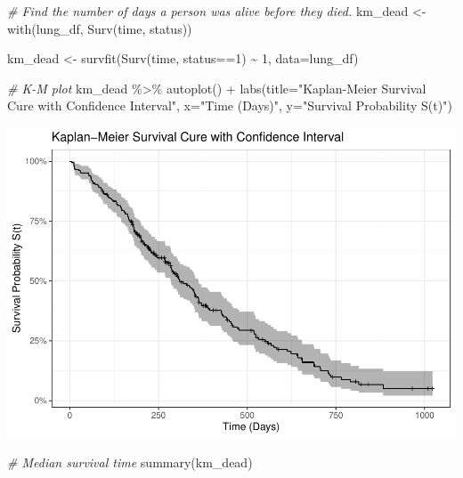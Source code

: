 \documentclass[
]{article}
\newenvironment{Shaded}{\begin{snugshade}}{\end{snugshade}}
\newcommand{\AttributeTok}[1]{\textcolor[rgb]{0.77,0.63,0.00}{#1}}
\newcommand{\CommentTok}[1]{\textcolor[rgb]{0.56,0.35,0.01}{\textit{#1}}}
\newcommand{\DecValTok}[1]{\textcolor[rgb]{0.00,0.00,0.81}{#1}}
\newcommand{\FunctionTok}[1]{\textcolor[rgb]{0.00,0.00,0.00}{#1}}
\newcommand{\NormalTok}[1]{#1}
\newcommand{\OtherTok}[1]{\textcolor[rgb]{0.56,0.35,0.01}{#1}}
\newcommand{\SpecialCharTok}[1]{\textcolor[rgb]{0.00,0.00,0.00}{#1}}
\newcommand{\StringTok}[1]{\textcolor[rgb]{0.31,0.60,0.02}{#1}}
\begin{document}
\begin{Shaded}
\begin{Highlighting}[]
\CommentTok{\# Find the number of days a person was alive before they died.}
\NormalTok{km\_dead }\OtherTok{\textless{}{-}} \FunctionTok{with}\NormalTok{(lung\_df, }\FunctionTok{Surv}\NormalTok{(time, status))}

\NormalTok{km\_dead }\OtherTok{\textless{}{-}} \FunctionTok{survfit}\NormalTok{(}\FunctionTok{Surv}\NormalTok{(time, status}\SpecialCharTok{==}\DecValTok{1}\NormalTok{) }\SpecialCharTok{\textasciitilde{}} \DecValTok{1}\NormalTok{, }\AttributeTok{data=}\NormalTok{lung\_df)}

\CommentTok{\# K{-}M plot}
\NormalTok{km\_dead }\SpecialCharTok{\%\textgreater{}\%} \FunctionTok{autoplot}\NormalTok{() }\SpecialCharTok{+} \FunctionTok{labs}\NormalTok{(}\AttributeTok{title=}\StringTok{"Kaplan{-}Meier Survival Cure with Confidence Interval"}\NormalTok{, }
                              \AttributeTok{x=}\StringTok{"Time (Days)"}\NormalTok{, }
                              \AttributeTok{y=}\StringTok{"Survival Probability S(t)"}\NormalTok{)}
\end{Highlighting}
\end{Shaded}

\includegraphics{final_project_files/figure-latex/unnamed-chunk-10-1.pdf}

\begin{Shaded}
\begin{Highlighting}[]
\CommentTok{\# Median survival time}
\FunctionTok{summary}\NormalTok{(km\_dead)}
\end{Highlighting}
\end{Shaded}
\end{document}
